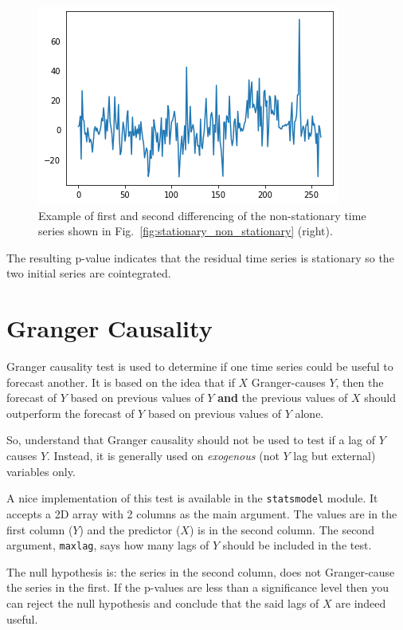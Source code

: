 \begin{figure}[htb]
	\centering
	\includegraphics[width=0.7\linewidth]{figures/residual_plot.png}
	\caption{Example of first and second differencing of the non-stationary time series shown in Fig.~\ref{fig:stationary_non_stationary} (right).}
	\label{fig:residual}
\end{figure}
    
The resulting p-value indicates that the residual time series is stationary so the two initial series are cointegrated.

\section{Granger Causality}\label{granger-causality}

Granger causality test is used to determine if one time series could be useful to forecast another. It is based on the idea that if \(X\) Granger-causes \(Y\), then the forecast of \(Y\) based on previous values of \(Y\) \textbf{and} the previous values of \(X\) should outperform the forecast of \(Y\) based on previous values of \(Y\) alone.

So, understand that Granger causality should not be used to test if a lag of \(Y\) causes \(Y\). Instead, it is generally used on \emph{exogenous} (not \(Y\) lag but external) variables only.

A nice implementation of this test is available in the \texttt{statsmodel} module. It accepts a 2D array with 2 columns as the
main argument. The values are in the first column ($Y$) and the predictor ($X$) is in the second column. The second argument, \texttt{maxlag}, says how many lags of \(Y\) should be included in the test.

The null hypothesis is: the series in the second column, does not Granger-cause the series in the first. If the p-values are less than a significance level then you can reject the null hypothesis and conclude that the said lags of \(X\) are indeed useful.

